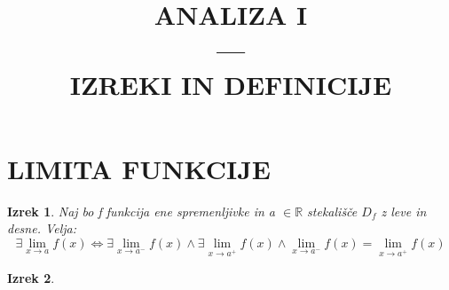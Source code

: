 \documentclass[a4paper, 10pt]{article}
\begin{document}

\title{
    ANALIZA I \\
     —\\
    \large IZREKI IN DEFINICIJE \\
}

\author{}
\date{}
\maketitle

{\theoremstyle{plain}
\newtheorem{izrek}{Izrek}
}


{\theoremstyle{definition}
\newtheorem{definicija}{Definicija}
}

\newpage
\section{LIMITA FUNKCIJE}

\begin{izrek}
    Naj bo f funkcija ene spremenljivke in a $\in \mathbb{R}$ stekališče $D_f$ z leve in desne. Velja: \\
    \[\exists\lim_{x \rightarrow a}f(x) \iff \exists\lim_{x \rightarrow a^-}f(x)  \wedge \exists\lim_{x \rightarrow a^+}f(x) \wedge \lim_{x \rightarrow a^-}f(x)  = \lim_{x \rightarrow a^+}f(x)  \] 
\end{izrek}

\begin{izrek}

\end{izrek}
\end{document}
